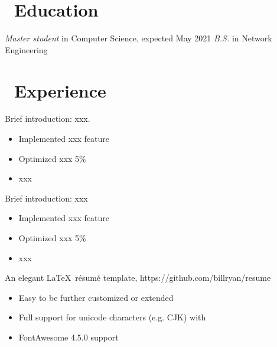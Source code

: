 \documentclass{resume}
\begin{document}



\section{\faGraduationCap\ Education}
\textit{Master student} in Computer Science, expected May 2021
\textit{B.S.} in Network Engineering

\section{\faUsers\ Experience}
Brief introduction: xxx.
\begin{itemize}
  \item Implemented xxx feature
  \item Optimized xxx 5\%
  \item xxx
\end{itemize}

Brief introduction: xxx
\begin{itemize}
  \item Implemented xxx feature
  \item Optimized xxx 5\%
  \item xxx
\end{itemize}

An elegant \LaTeX\ résumé template, https://github.com/billryan/resume
\begin{itemize}
  \item Easy to be further customized or extended
  \item Full support for unicode characters (e.g. CJK) with \XeLaTeX\
  \item FontAwesome 4.5.0 support
\end{itemize}
\end{document}
